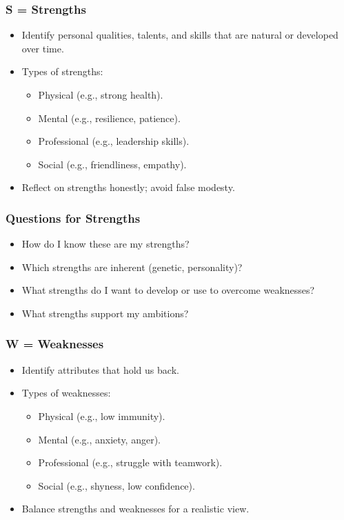 \begin{frame}[fragile]\frametitle{S = Strengths}
    \begin{itemize}
        \item Identify personal qualities, talents, and skills that are natural or developed over time.
        \item Types of strengths:
        \begin{itemize}
            \item Physical (e.g., strong health).
            \item Mental (e.g., resilience, patience).
            \item Professional (e.g., leadership skills).
            \item Social (e.g., friendliness, empathy).
        \end{itemize}
        \item Reflect on strengths honestly; avoid false modesty.
    \end{itemize}
\end{frame}

\begin{frame}[fragile]\frametitle{Questions for Strengths}
    \begin{itemize}
        \item How do I know these are my strengths?
        \item Which strengths are inherent (genetic, personality)?
        \item What strengths do I want to develop or use to overcome weaknesses?
        \item What strengths support my ambitions?
    \end{itemize}
\end{frame}

\begin{frame}[fragile]\frametitle{W = Weaknesses}
    \begin{itemize}
        \item Identify attributes that hold us back.
        \item Types of weaknesses:
        \begin{itemize}
            \item Physical (e.g., low immunity).
            \item Mental (e.g., anxiety, anger).
            \item Professional (e.g., struggle with teamwork).
            \item Social (e.g., shyness, low confidence).
        \end{itemize}
        \item Balance strengths and weaknesses for a realistic view.
    \end{itemize}
\end{frame}

